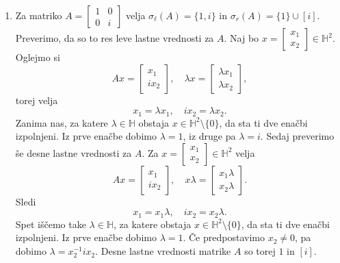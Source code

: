 \documentclass[mat1, tisk]{fmfdelo}
\numberwithin{equation}{section}
\begin{document}
\begin{zgled}
    \begin{enumerate}
        \item Za matriko
        $
        A =
        \begin{bmatrix}
            1 & 0\\
            0 & i
        \end{bmatrix}
        $ velja $\sigma_{\ell}(A) = \{1, i\}$ in $\sigma_{r}(A) = \{1\} \cup \left[i\right]$.
        Preverimo, da so to res leve lastne vrednosti za $A$.
        Naj bo $x = \begin{bmatrix}x_1 \\ x_2\end{bmatrix} \in \mathbb{H}^2$.
        Oglejmo si
        \[
        Ax = \begin{bmatrix}x_1 \\ i x_2\end{bmatrix}, \quad
        \lambda x = \begin{bmatrix}\lambda x_1 \\ \lambda x_2\end{bmatrix},
        \]
        torej velja
        $$x_1 = \lambda x_1, \quad
                    i x_2 = \lambda x_2.$$
        Zanima nas, za katere $\lambda \in \mathbb{H}$ obstaja $x \in \mathbb{H}^2 \setminus \{0\}$, da sta ti dve enačbi izpolnjeni.
        Iz prve enačbe dobimo $\lambda = 1$, iz druge pa $\lambda = i$.
        Sedaj preverimo še desne lastne vrednosti za $A$. Za $x = \begin{bmatrix}x_1 \\ x_2\end{bmatrix} \in \mathbb{H}^2$ velja
        \[
        Ax = \begin{bmatrix}x_1 \\ i x_2\end{bmatrix}, \quad
        x \lambda = \begin{bmatrix} x_1 \lambda\\  x_2 \lambda \end{bmatrix}.
        \]
        Sledi
        $$x_1 = x_1 \lambda, \quad
        ix_2 = x_2 \lambda.$$
        Spet iščemo take $\lambda \in \mathbb{H}$, za katere obstaja $x \in \mathbb{H}^2 \setminus \{0\}$, da sta ti dve enačbi izpolnjeni.
        Iz prve enačbe dobimo $\lambda = 1$. Če predpostavimo $x_2 \neq 0$, pa dobimo $\lambda = x_2^{-1}ix_2$. Desne lastne vrednosti matrike $A$
        so torej $1$ in $[i]$.
        


\end{enumerate}
\end{zgled}
\end{document}
